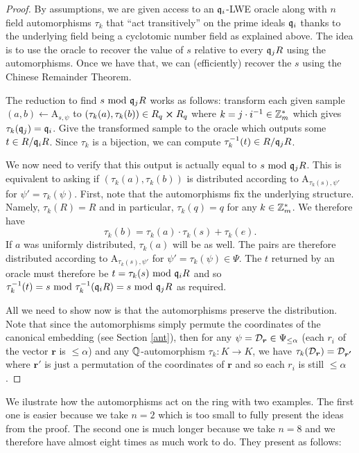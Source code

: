 \begin{proof}
	By assumptions, we are given access to an $\mathfrak{q}_i$-LWE oracle along with $n$ field automorphisms $\tau_k$ that ``act transitively'' on the prime ideals $\mathfrak{q}_i$ thanks to the underlying field being a cyclotomic number field as explained above. The idea is to use the oracle to recover the value of $s$ relative to every $\mathfrak{q}_j R$ using the automorphisms. Once we have that, we can (efficiently) recover the $s$ using the Chinese Remainder Theorem. 

	The reduction to find $s \text{ mod } \mathfrak{q}_j R$ works as follows: transform each given sample $(a,b) \leftarrow \text{A}_{s, \psi}$ to $(\tau_k(a), \tau_k(b)) \in R_q \cross R_q$ where $k = j \cdot i^{-1} \in \mathbb{Z}^*_m$ which gives $\tau_k(\mathfrak{q}_j) = \mathfrak{q}_i$. Give the transformed sample to the oracle which outputs some $t \in R / \mathfrak{q}_i R$. Since $\tau_k$ is a bijection, we can compute $\tau^{-1}_k(t) \in R / \mathfrak{q}_j R$.

	We now need to verify that this output is actually equal to $s \text{ mod } \mathfrak{q}_j R$. This is equivalent to asking if $(\tau_k(a), \tau_k(b))$ is distributed according to A$_{\tau_k(s), \psi '}$ for $\psi ' = \tau_k(\psi)$. First, note that the automorphisms fix the underlying structure. Namely, $\tau_k(R) = R$ and in particular, $\tau_k(q) = q$ for any $k \in \mathbb{Z}_m^*$. We therefore have
	\[ \tau_k(b) = \tau_k(a)\cdot \tau_k(s) + \tau_k(e).\]
	If $a$ was uniformly distributed, $\tau_k(a)$ will be as well. The pairs are therefore distributed according to A$_{\tau_k(s), \psi '}$ for $\psi ' = \tau_k(\psi) \in \Psi$. The $t$ returned by an oracle must therefore be $t = \tau_k(s) \text{ mod } \mathfrak{q}_i R$ and so $\tau_k^{-1}(t) = s \text{ mod } \tau_k^{-1}(\mathfrak{q}_i R) = s \text{ mod } \mathfrak{q}_j R$ as required. 

	All we need to show now is that the automorphisms preserve the distribution. Note that since the automorphisms simply permute the coordinates of the canonical embedding (see Section \ref{ant}), then for any $\psi = \mathcal{D}_{\boldsymbol{r}} \in \Psi_{\leq \alpha}$ (each $r_i$ of the vector $\bm{r}$ is $\leq \alpha$) and any $\mathbb{Q}$-automorphism $\tau_k: K \rightarrow K$, we have $\tau_k(\mathcal{D}_{\boldsymbol{r}}) = \mathcal{D}_{\boldsymbol{r'}}$ where $\bm{r'}$ is just a permutation of the coordinates of $\bm{r}$ and so each $r_i$ is still $\leq \alpha$.

\end{proof}
We ilustrate how the automorphisms act on the ring with two examples. The first one is easier because we take $n = 2$ which is too small to fully present the ideas from the proof. The second one is much longer because we take $n=8$ and we therefore have almost eight times as much work to do. They present as follows:
